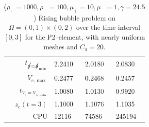 \begin{table}
\begin{tabular}{rlll}
$t_{\strikes = \strikes_{\min}}$ & 2.2410 & 2.0180 & 2.0830 \\
$V_{c,\max}$                     & 0.2477 & 0.2468 & 0.2457 \\
$t_{V_c = V_{c,\max}}$           & 1.0080 & 1.0130 & 0.9920 \\
$z_c(t=3)$                       & 1.1000 & 1.1076 & 1.1035 \\
CPU                              &  12116 &  74586 & 245194 \\
\hline
\end{tabular}
\hspace*{-3.25cm}
\caption[Navier--Stokes 2d rising bubble benchmark values P2--\pdg]
{($\rho_+ = 1000,\rho_- = 100,\mu_+ = 10,\mu_- =1,\gamma = 24.5$)
Rising bubble problem on ${\Omega = (0,1) \times (0,2)}$ over the time interval
$[0,3]$ for the P2--\pdg element, with nearly uniform meshes and
$C_a=20$\textdegree.}
\label{tab:risingbubble2Dp2p1dg}
\end{table}

